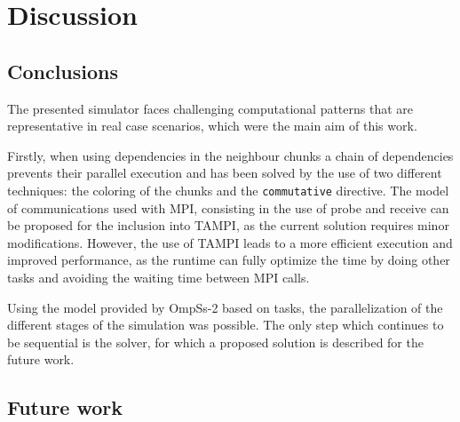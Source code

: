 \chapter{Discussion}
\label{ch:discussion}


\section{Conclusions}

The presented simulator faces challenging computational patterns that are 
representative in real case scenarios, which were the main aim of this work.

Firstly, when using dependencies in the neighbour chunks a chain of dependencies 
prevents their parallel execution and has been solved by the use of two 
different techniques: the coloring of the chunks and the \texttt{commutative} 
directive.
%
The model of communications used with MPI, consisting in the use of probe and 
receive can be proposed for the inclusion into TAMPI, as the current solution 
requires minor modifications.
%
However, the use of TAMPI leads to a more efficient execution and improved 
performance, as the runtime can fully optimize the time by doing other tasks and 
avoiding the waiting time between MPI calls.

Using the model provided by OmpSs-2 based on tasks, the parallelization of the 
different stages of the simulation was possible. The only step which continues 
to be sequential is the solver, for which a proposed solution is described for 
the future work.

\section{Future work}

